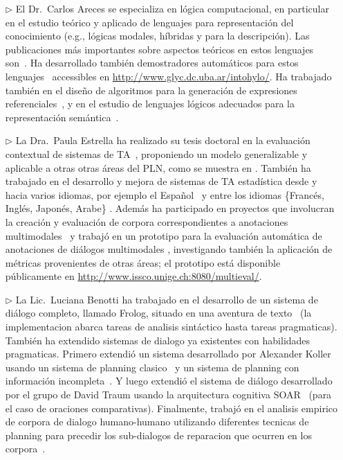 \begin{itemize}

\item[$\triangleright$] El Dr.\ Carlos Areces se especializa en l\'ogica computacional,
en particular en el estudio te\'orico y aplicado de lenguajes para
representaci\'on del conocimiento (e.g., l\'ogicas modales, h\'ibridas y
para la descripci\'on).  Las publicaciones
m\'as importantes sobre aspectos te\'oricos en estos lenguajes
son~\citep{ABM01,arec:hybr05b}.  Ha desarrollado tambi\'en demostradores
autom\'aticos para estos lenguajes~\citep{ANR01,arec:hylo02a,AG06,Hoffmann2007}
accessibles en \url{http://www.glyc.dc.uba.ar/intohylo/}.
Ha trabajado tambi\'en en el dise\~no de algoritmos para la generaci\'on de
expresiones referenciales~\citep{AKS08}, y en el estudio de lenguajes l\'ogicos
adecuados para la representaci\'on sem\'antica~\citep{AF08}.

\item[$\triangleright$] La Dra.\ Paula Estrella ha realizado su tesis doctoral en la evaluaci\'on contextual de sistemas de TA~\citep{estr:impr08, estr:femt09}, proponiendo un modelo generalizable y aplicable a otras otras \'areas del PLN, como se muestra en \citep{Miller2008}. Tambi\'en ha trabajado en el desarrollo y mejora de sistemas de TA estad\'istica desde y hacia varios idiomas, por ejemplo el Espa\~nol~\citep{estr:expe05} y entre los idiomas \{Franc\'es, Ingl\'es, Japon\'es, Arabe\} \citep{rayner-EtAl:2009:GEAF}. Adem\'as ha participado en proyectos que involucran la creaci\'on y evaluaci\'on de corpora correspondientes a anotaciones multimodales~\citep{pope:estr07} y trabaj\'o en un prototipo para la evaluaci\'on autom\'atica de anotaciones de di\'alogos multimodales \citep{multieval}, investigando tambi\'en la aplicaci\'on de m\'etricas provenientes de otras \'areas; el prototipo est\'a disponible p\'ublicamente en \url{http://www.issco.unige.ch:8080/multieval/}. 


\item[$\triangleright$] La Lic.\ Luciana Benotti ha trabajado en el desarrollo de un sistema de
di\'alogo completo, llamado Frolog, situado en una aventura de
texto~\citep{benotti09b} (la implementacion abarca tareas de analisis
sint\'actico hasta tareas pragmaticas). Tambi\'en ha extendido sistemas de
dialogo ya existentes con habilidades pragmaticas. Primero extendi\'o un
sistema desarrollado por Alexander Koller~\citep{koller04} usando un sistema de
planning clasico~\citep{benotti07} y un sistema de planning con informaci\'on
incompleta~\citep{benotti08}. Y luego extendi\'o el sistema de di\'alogo
desarrollado por el grupo de David Traum usando la arquitectura cognitiva
SOAR~\citep{benotti09a} (para el caso de oraciones comparativas). Finalmente,
trabaj\'o en el analisis empirico de corpora de dialogo humano-humano utilizando
diferentes tecnicas de planning para precedir los sub-dialogos de reparacion que
ocurren en los corpora~\citep{benotti09c}.

\end{itemize}

